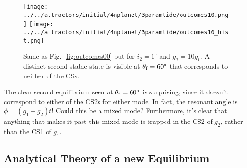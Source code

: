 \documentclass[11pt,
        usenames, %
        dvipsnames %
    ]{article}
\newcommand*{\p}[1]{\left(#1\right)}
\begin{document}
\begin{figure}
    \centering
    \texttt{[image: ../../attractors/initial/4nplanet/3paramtide/outcomes10.png]}
    \texttt{[image: ../../attractors/initial/4nplanet/3paramtide/outcomes10\_hist.png]}
    \caption{Same as Fig.~\ref{fig:outcomes00} but for $i_2 = 1^\circ$ and $g_2
    = 10g_1$. A distinct second stable state is visible at $\theta_{\rm f} = 60^
    \circ$ that corresponds to neither of the CSs.}\label{fig:outcomes10}
\end{figure}

The clear second equilibrium seen at $\theta_{\rm f} = 60^\circ$ is surprising,
since it doesn't correspond to either of the CS2s for either mode. In fact, the
resonant angle is $\phi = \p{g_1 + g_2}t$! Could this be a mixed mode?
Furthermore, it's clear that anything that makes it past this mixed mode is
trapped in the CS2 of $g_2$, rather than the CS1 of $g_1$.

\subsection{Analytical Theory of a new Equilibrium}
\end{document}
